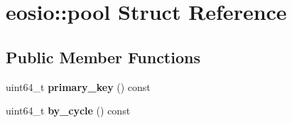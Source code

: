 \hypertarget{structeosio_1_1pool}{}\section{eosio\+:\+:pool Struct Reference}
\label{structeosio_1_1pool}
\subsection*{Public Member Functions}
\begin{DoxyCompactItemize}
\item 
\mbox{\label{structeosio_1_1pool_aaaabdd425fc78c62e562f59fb8fa4960}} 
uint64\+\_\+t {\bfseries primary\+\_\+key} () const
\item 
\mbox{\label{structeosio_1_1pool_a52575e2e06ac68995e555b21fecbd4b4}} 
uint64\+\_\+t {\bfseries by\+\_\+cycle} () const
\end{DoxyCompactItemize}

